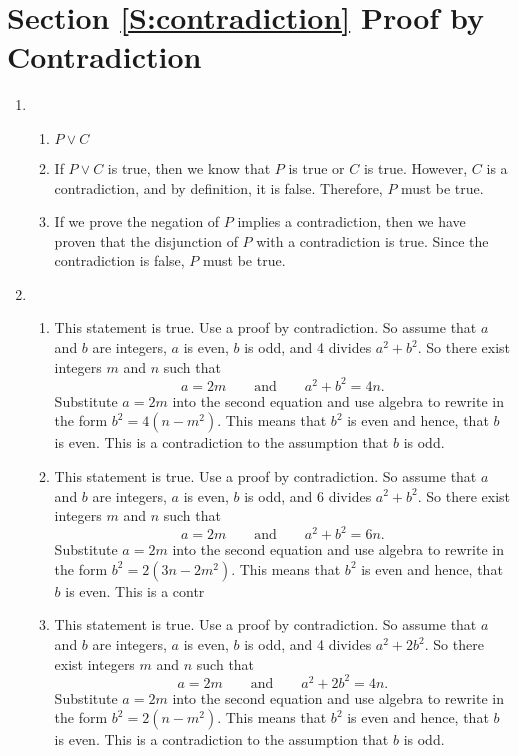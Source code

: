 \section*{Section \ref{S:contradiction} Proof by Contradiction}

\begin{enumerate}
\item
\begin{enumerate} 
\item $P \vee C$
\item If $P \vee C$ is true, then we know that $P$ is true or $C$ is true.  However, $C$ is a contradiction, and by definition, it is false.  Therefore, $P$ must be true.
\item If we prove the negation of $P$ implies a contradiction, then we have proven that the disjunction of $P$ with a contradiction is true.  Since the contradiction is false, $P$ must be true.
\end{enumerate}




\item \begin{enumerate}
\item This statement is true.  Use a proof by contradiction.  So assume that $a$ and $b$ are integers, $a$ is even, $b$ is odd, and 4 divides $a^2 + b^2$.  So there exist integers $m$ and 
$n$ such that
\[
a = 2m \qquad \text{and} \qquad a^2 + b^2 = 4n.
\]
Substitute $a = 2m$ into the second equation and use algebra to rewrite in the form 
$b^2 = 4(n - m^2)$.  This means that $b^2$ is even and hence, that $b$ is even.  This is a contradiction to the assumption that $b$ is odd.


\item This statement is true.  Use a proof by contradiction.  So assume that $a$ and $b$ are integers, $a$ is even, $b$ is odd, and 6 divides $a^2 + b^2$.  So there exist integers $m$ and 
$n$ such that
\[
a = 2m \qquad \text{and} \qquad a^2 + b^2 = 6n.
\]
Substitute $a = 2m$ into the second equation and use algebra to rewrite in the form 
$b^2 = 2(3n - 2m^2)$.  This means that $b^2$ is even and hence, that $b$ is even.  This is a contr

\item This statement is true.  Use a proof by contradiction.  So assume that $a$ and $b$ are integers, $a$ is even, $b$ is odd, and 4 divides $a^2 + 2b^2$.  So there exist integers $m$ and 
$n$ such that
\[
a = 2m \qquad \text{and} \qquad a^2 + 2b^2 = 4n.
\]
Substitute $a = 2m$ into the second equation and use algebra to rewrite in the form 
$b^2 = 2(n - m^2)$.  This means that $b^2$ is even and hence, that $b$ is even.  This is a contradiction to the assumption that $b$ is odd.


\end{enumerate}
\end{enumerate}
